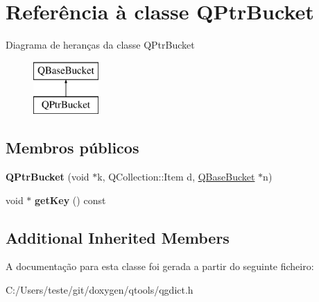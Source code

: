 \hypertarget{class_q_ptr_bucket}{\section{Referência à classe Q\-Ptr\-Bucket}
\label{class_q_ptr_bucket}
}
Diagrama de heranças da classe Q\-Ptr\-Bucket\begin{figure}[H]
\begin{center}
\leavevmode
\includegraphics[height=2.000000cm]{class_q_ptr_bucket}
\end{center}
\end{figure}
\subsection*{Membros públicos}
\begin{DoxyCompactItemize}
\item 
\hypertarget{class_q_ptr_bucket_a9295c404c2cb747d10107a357478e4df}{{\bfseries Q\-Ptr\-Bucket} (void $\ast$k, Q\-Collection\-::\-Item d, \hyperlink{class_q_base_bucket}{Q\-Base\-Bucket} $\ast$n)}\label{class_q_ptr_bucket_a9295c404c2cb747d10107a357478e4df}

\item 
\hypertarget{class_q_ptr_bucket_a597cbc6223926d72fafe76e0f85ffcff}{void $\ast$ {\bfseries get\-Key} () const }\label{class_q_ptr_bucket_a597cbc6223926d72fafe76e0f85ffcff}

\end{DoxyCompactItemize}
\subsection*{Additional Inherited Members}


A documentação para esta classe foi gerada a partir do seguinte ficheiro\-:\begin{DoxyCompactItemize}
\item 
C\-:/\-Users/teste/git/doxygen/qtools/qgdict.\-h\end{DoxyCompactItemize}
